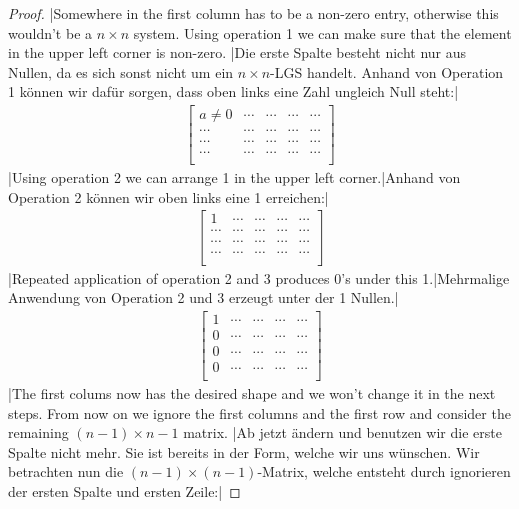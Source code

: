 \begin{proof}
\tr|Somewhere in the first column has to be a non-zero entry, otherwise this wouldn't be a $n\times n$ system.
    Using operation 1 we can make sure that the element in the upper left corner is non-zero. 
   |Die erste Spalte besteht nicht nur aus Nullen, da es sich sonst nicht um ein $n\times n$-LGS handelt. Anhand von Operation 1 können wir dafür sorgen, dass oben links eine Zahl ungleich Null steht:|
\begin{eqnarray*}
\left[\begin{array}{rrrr|r}
a\neq 0& \cdots&\cdots&\cdots&\cdots\\
\cdots&\cdots&\cdots&\cdots&\cdots\\
\cdots&\cdots&\cdots&\cdots&\cdots\\
\cdots&\cdots&\cdots&\cdots&\cdots\\
\end{array}\right]
\end{eqnarray*}
\tr|Using operation 2 we can arrange 1 in the upper left corner.|Anhand von Operation 2 können wir oben links eine 1 erreichen:|
\begin{eqnarray*}
\left[\begin{array}{rrrr|r}
1& \cdots&\cdots&\cdots&\cdots\\
\cdots&\cdots&\cdots&\cdots&\cdots\\
\cdots&\cdots&\cdots&\cdots&\cdots\\
\cdots&\cdots&\cdots&\cdots&\cdots\\
\end{array}\right]
\end{eqnarray*}
\tr|Repeated application of operation 2 and 3 produces 0's under this 1.|Mehrmalige Anwendung von Operation 2 und 3 erzeugt unter der 1 Nullen.|
\begin{eqnarray*}
\left[\begin{array}{rrrr|r}
1& \cdots&\cdots&\cdots&\cdots\\
0&\cdots&\cdots&\cdots&\cdots\\
0&\cdots&\cdots&\cdots&\cdots\\
0&\cdots&\cdots&\cdots&\cdots\\
\end{array}\right]
\end{eqnarray*}
\tr|The first colums now has the desired shape and we won't change it in the next steps.
    From now on we ignore the first columns and the first row and consider the remaining $(n-1) \times n-1$ matrix.
   |Ab jetzt ändern und benutzen wir die erste Spalte nicht mehr. Sie ist bereits in der Form, welche wir uns wünschen.
    Wir betrachten nun die $(n-1)\times (n-1)$-Matrix, welche entsteht durch ignorieren der ersten Spalte und ersten Zeile:|


\end{proof}
